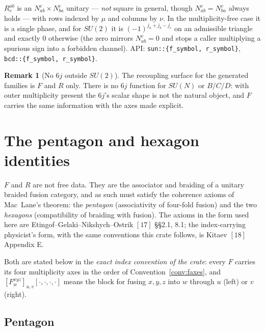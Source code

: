 \documentclass[11pt,a4paper]{article}
\theoremstyle{plain}
\theoremstyle{definition}
\newtheorem{remark}[theorem]{Remark}
\newcommand{\code}[1]{\texttt{#1}}
\begin{document}
$R^{ab}_c$ is an $N^c_{ab}\times N^c_{ba}$ unitary --- \emph{not} square in
general, though $N^c_{ab}=N^c_{ba}$ always holds --- with rows indexed by $\mu$
and columns by $\nu$. In the multiplicity-free case it is a single phase, and
for $SU(2)$ it is $(-1)^{j_a+j_b-j_c}$ on an admissible triangle and exactly
$0$ otherwise (the zero mirrors $N^c_{ab}=0$ and stops a caller multiplying a
spurious sign into a forbidden channel). API:
\code{sun::\{f\_symbol, r\_symbol\}}, \code{bcd::\{f\_symbol, r\_symbol\}}.

\begin{remark}[No $6j$ outside $SU(2)$]
The recoupling surface for the generated families is $F$ and $R$ only. There is
no $6j$ function for $SU(N)$ or $B/C/D$: with outer multiplicity present the
$6j$'s scalar shape is not the natural object, and $F$ carries the same
information with the axes made explicit.
\end{remark}

\section{The pentagon and hexagon identities}
\label{sec:pentagon}

$F$ and $R$ are not free data. They are the associator and braiding of a
unitary braided fusion category, and as such must satisfy the coherence axioms
of Mac~Lane's theorem: the \emph{pentagon} (associativity of four-fold fusion)
and the two \emph{hexagons} (compatibility of braiding with fusion). The
axioms in the form used here are Etingof--Gelaki--Nikshych--Ostrik $[17]$
\S\S2.1, 8.1; the index-carrying physicist's form, with the same conventions
this crate follows, is Kitaev $[18]$ Appendix E.

Both are stated below in the \emph{exact index convention of the crate}: every
$F$ carries its four multiplicity axes in the order of
Convention~\ref{conv:faxes}, and $[F^{xyz}_{w}]_{u,v}[\cdot,\cdot,\cdot,\cdot]$
means the block for fusing $x,y,z$ into $w$ through $u$ (left) or $v$ (right).

\subsection{Pentagon}
\end{document}
